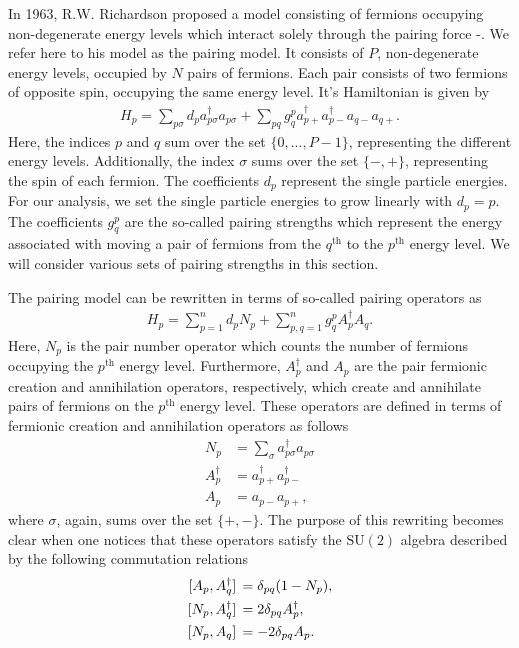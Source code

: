 \documentclass[Dual]{msu-thesis}
\begin{document}
In 1963, R.W. Richardson proposed a model consisting of fermions occupying non-degenerate energy levels which interact solely through the pairing force \cite{ref:rich1}-\cite{ref:rich2}. We refer here to his model as the pairing model. It consists of $P$, non-degenerate energy levels, occupied by $N$ pairs of fermions. Each pair consists of two fermions of opposite spin, occupying the same energy level. It's Hamiltonian is given by
\begin{align}
\label{pairing_model_hamiltonian_original}
H_p=\sum_{p\sigma}d_pa^\dagger_{p\sigma}a_{p\sigma}+\sum_{pq}g^p_qa^{\dagger}_{p+}a^{\dagger}_{p-}a_{q-}a_{q+}.
\end{align}
Here, the indices $p$ and $q$ sum over the set $\{0,...,P-1\}$, representing the different energy levels. Additionally, the index $\sigma$ sums over the set $\{-,+\}$, representing the spin of each fermion. The coefficients $d_p$ represent the single particle energies. For our analysis, we set the single particle energies to grow linearly with $d_p=p$. The coefficients $g^p_q$ are the so-called pairing strengths which represent the energy associated with moving a pair of fermions from the $q^{\text{th}}$ to the $p^{\text{th}}$ energy level. We will consider various sets of pairing strengths in this section. 

The pairing model can be rewritten in terms of so-called pairing operators as
\begin{align}
\label{pairing_model_hamiltonian}
H_p=\sum_{p=1}^nd_pN_p+\sum_{p,q=1}^ng^p_qA^\dagger_pA_q
.\end{align}
Here, $N_p$ is the pair number operator which counts the number of fermions occupying the $p^{\text{th}}$ energy level. Furthermore, $A^\dagger_p$ and $A_p$ are the pair fermionic creation and annihilation operators, respectively, which create and annihilate pairs of fermions on the $p^{\text{th}}$ energy level. These operators are defined in terms of fermionic creation and annihilation operators as follows
\begin{align}
\label{pair_fermionic_operators}
N_p &= \sum_{\sigma}a^\dagger_{p\sigma}a_{p\sigma}
\\
A^{\dagger}_p &= a^{\dagger}_{p+}a^{\dagger}_{p-}
\\
A_p &= a_{p-}a_{p+},
\end{align}
where $\sigma$, again, sums over the set $\{+,-\}$. The purpose of this rewriting becomes clear when one notices that these operators satisfy the $\text{SU}(2)$ algebra described by the following commutation relations
\begin{align}
\label{AAd_comm}
\comm*{A_p}{A^\dagger_q}&=\delta_{pq}(1-N_p),
\\
\label{NAd_comm}
\comm*{N_p}{A^\dagger_q}&=2\delta_{pq}A^\dagger_p,
\\
\label{NA_comm}
\comm*{N_p}{A_q}&=-2\delta_{pq}A_p.
\end{align}
\end{document}
